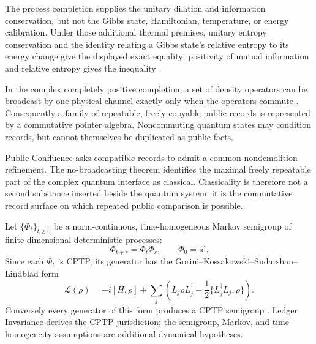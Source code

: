 \begin{proofsketch}
The process completion supplies the unitary dilation and information conservation,
but not the Gibbs state, Hamiltonian, temperature, or energy calibration.  Under
those additional thermal premises, unitary entropy conservation and the identity
relating a Gibbs state's relative entropy to its energy change give the displayed
exact equality; positivity of mutual information and relative entropy gives the
inequality \cite{reeb-wolf-landauer}.
\end{proofsketch}

\begin{theorem}
\label{thm:no-broadcasting-records}
In the complex completely positive completion, a set of density operators can be
broadcast by one physical channel exactly only when the operators commute
\cite{barnum-broadcasting}.  Consequently a family of repeatable, freely copyable
public records is represented by a commutative pointer algebra.  Noncommuting
quantum states may condition records, but cannot themselves be duplicated as
public facts.
\end{theorem}

\begin{remark}
Public Confluence asks compatible records to admit a common nondemolition
refinement.  The no-broadcasting theorem identifies the maximal freely repeatable
part of the complex quantum interface as classical.  Classicality is therefore not
a second substance inserted beside the quantum system; it is the commutative record
surface on which repeated public comparison is possible.
\end{remark}

\begin{theorem}
\label{thm:gksl-conditional}
Let \(\{\Phi_t\}_{t\ge0}\) be a norm-continuous, time-homogeneous Markov semigroup of
finite-dimensional deterministic processes:
\[
 \Phi_{t+s}=\Phi_t\Phi_s,
 \qquad
 \Phi_0=\mathrm{id}.
\]
Since each \(\Phi_t\) is CPTP, its generator has the
Gorini--Kossakowski--Sudarshan--Lindblad form
\[
 \boxed{
 \mathcal L(\rho)
 =-i[H,\rho]
 +\sum_j
 \left(
 L_j\rho L_j^\dagger
 -\frac12\{L_j^\dagger L_j,\rho\}
 \right).}
\]
Conversely every generator of this form produces a CPTP semigroup
\cite{gks,lindblad}.  Ledger Invariance derives the CPTP jurisdiction; the semigroup,
Markov, and time-homogeneity assumptions are additional dynamical hypotheses.
\end{theorem}

